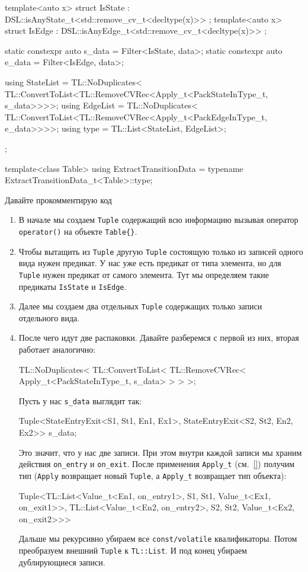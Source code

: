 \documentclass{article}
\begin{document}
{\begin{cppcode}
{  template<auto x>
  struct IsState : DSL::isAnyState_t<std::remove_cv_t<decltype(x)>> {};
  template<auto x>
  struct IsEdge : DSL::isAnyEdge_t<std::remove_cv_t<decltype(x)>> {};

  static constexpr auto s_data = Filter<IsState, data>;
  static constexpr auto e_data = Filter<IsEdge, data>;

  using StateList = TL::NoDuplicates<
      TL::ConvertToList<TL::RemoveCVRec<Apply_t<PackStateInType_t, s_data>>>>;
  using EdgeList = TL::NoDuplicates<
      TL::ConvertToList<TL::RemoveCVRec<Apply_t<PackEdgeInType_t, e_data>>>>;
  using type = TL::List<StateList, EdgeList>;
};

template<class Table>
using ExtractTransitionData = typename ExtractTransitionData_t<Table>::type;
\end{cppcode}
Давайте прокомментирую код
\begin{enumerate}
\item В начале мы создаем \verb"Tuple" содержащий всю информацию вызывая оператор \verb"operator()" на объекте \verb"Table{}".

\item Чтобы вытащить из \verb"Tuple" другую \verb"Tuple" состоящую только из записей одного вида нужен предикат.
У нас уже есть предикат от типа элемента, но для \verb"Tuple" нужен предикат от самого элемента.
Тут мы определяем такие предикаты \verb"IsState" и \verb"IsEdge".

\item Далее мы создаем два отдельных \verb"Tuple" содержащих только записи отдельного вида.

\item После чего идут две распаковки.
Давайте разберемся с первой из них, вторая работает аналогично:
\begin{cppcode}
TL::NoDuplicates<
    TL::ConvertToList<
        TL::RemoveCVRec<
            Apply_t<PackStateInType_t, s_data>
        >
    >
>;
\end{cppcode}
Пусть у нас \verb"s_data" выглядит так:
\begin{cppcode}
Tuple<StateEntryExit<S1, St1, En1, Ex1>, StateEntryExit<S2, St2, En2, Ex2>> s_data;
\end{cppcode}
Это значит, что у нас две записи.
При этом внутри каждой записи мы храним действия \verb"on_entry" и \verb"on_exit".
После применения \verb"Apply_t" (см.~\ref{}) получим тип (\verb"Apply" возвращает новый \verb"Tuple", а \verb"Apply_t" возвращает тип объекта):
\begin{cppcode}
Tuple<TL::List<Value_t<En1, on_entry1>, S1, St1, Value_t<Ex1, on_exit1>>,
      TL::List<Value_t<En2, on_entry2>, S2, St2, Value_t<Ex2, on_exit2>>>
\end{cppcode}
Дальше мы рекурсивно убираем все \verb"const/volatile" квалификаторы.
Потом преобразуем внешний \verb"Tuple" к \verb"TL::List".
И под конец убираем дублирующиеся записи.


\end{enumerate}}
\end{document}

